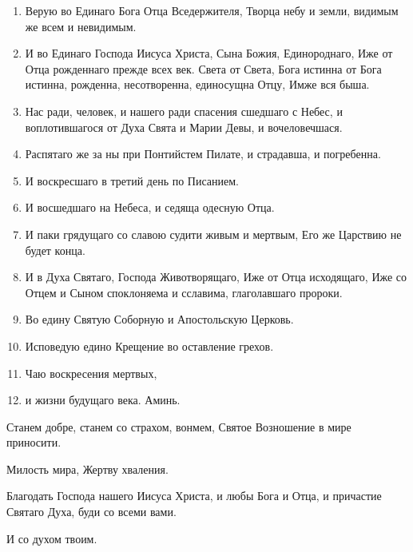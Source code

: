 \begin{mymulticols}
\begin{enumerate}
\item Верую во Единаго Бога Отца Вседержителя, Творца небу и земли, видимым же всем и невидимым. 

\item И во Единаго Господа Иисуса Христа, Сына Божия, Единороднаго, Иже от Отца рожденнаго прежде всех век. Света от Света, Бога истинна от Бога истинна, рожденна, несотворенна, единосущна Отцу, Имже вся быша.

\item Нас ради, человек, и нашего ради спасения сшедшаго с Небес, и воплотившагося от Духа Свята и Марии Девы, и вочеловечшася.

\item Распятаго же за ны при Понтийстем Пилате, и страдавша, и погребенна.

\item И воскресшаго в третий день по Писанием.

\item И восшедшаго на Небеса, и седяща одесную Отца.

\item И паки грядущаго со славою судити живым и мертвым, Его же Царствию не будет конца.

\item И в Духа Святаго, Господа Животворящаго, Иже от Отца исходящаго, Иже со Отцем и Сыном споклоняема и сславима, глаголавшаго пророки.

\item Во едину Святую Соборную и Апостольскую Церковь.

\item Исповедую едино Крещение во оставление грехов.

\item Чаю воскресения мертвых,

\item и жизни будущаго века. Аминь. 

\end{enumerate}


 Станем добре, станем со страхом, вонмем, Святое Возношение в мире приносити.

 Милость мира, Жертву хваления. 

 Благодать Господа нашего Иисуса Христа, и любы Бога и Отца, и причастие Святаго Духа, буди со всеми вами.

 И со духом твоим. 


\end{mymulticols}
